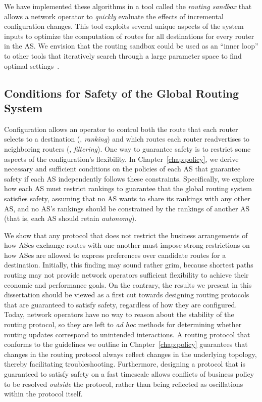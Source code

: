 We have implemented these algorithms in a tool called the {\em routing
sandbox} that allows a network operator to {\em quickly} evaluate the
effects of incremental configuration changes.  This tool exploits
several unique aspects of the system inputs to optimize the computation
of routes for all destinations for every router in the AS.  We envision
that the routing sandbox could be used as an ``inner loop'' to other
tools that iteratively search through a large parameter space to find
optimal settings~\cite{Ye2003}.

\subsection{Conditions for Safety of the Global Routing System}



Configuration allows an operator to control both the route that each
router selects to a destination (\ie, {\em ranking}) and which routes
each router readvertises to neighboring routers (\ie, {\em filtering}).
One way to guarantee safety is to restrict some aspects of the
configuration's flexibility.  In Chapter~\ref{chap:policy}, we derive
necessary and sufficient conditions on the policies of each AS that
guarantee safety
if each AS independently follows these constraints.  Specifically, we
explore how each AS 
must restrict rankings to guarantee that the global routing system
satisfies safety, assuming that no AS wants to share its rankings with
any other AS, and no AS's rankings should be constrained by the rankings
of another AS (that is, each AS should retain {\em autonomy}).

We show that any protocol that does not restrict the business
arrangements of how ASes exchange routes with one another must impose
strong restrictions on how ASes are allowed to express preferences over
candidate routes for a destination.
%
Initially, this finding may sound rather grim, because shortest paths
routing may not provide network operators sufficient flexibility to
achieve their economic and performance goals.  On the contrary, the
results we present in this dissertation should be viewed as a first cut
towards designing routing protocols that are guaranteed to satisfy
safety, regardless of how they are configured.  Today, network operators
have no way to reason about the stability of the routing protocol, so
they are left to {\em ad hoc} methods for determining whether routing
updates correspond to unintended interactions.  A routing protocol that
conforms to the guidelines we outline in Chapter~\ref{chap:policy}
guarantees that changes in the routing protocol always reflect changes
in the underlying topology, thereby facilitating troubleshooting.
Furthermore, designing a protocol that is guaranteed to satisfy safety
on a fast timescale allows conflicts of business policy to be resolved
{\em outside} the protocol, rather than being reflected as oscillations
within the protocol itself.


